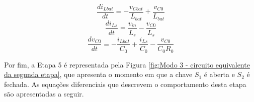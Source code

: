 

    

\begin{equation}
    \frac{d i_{Lbat}}{d t } =-\frac{v_{Cbat}}{L_{bat}}+\frac{v_{C0}}{L_{bat}}
    \label{ModoIIe3ilbat}
\end{equation}
\begin{equation}
    \frac{d i_{Ls}}{d t } =\frac{v_{in}}{L_{s}}-\frac{v_{C0}}{L_{s}}
    \label{ModoIIe3ils}
\end{equation}
\begin{equation}
    \frac{d v_{C0}}{d t } =-\frac{i_{Lbat}}{C_0}+ \frac{i_{Ls}}{C_0} -\frac {v_{C0}}{C_{0}R_{0}} 
    \label{ModoIIe3Vc0}
\end{equation}


Por fim, a Etapa 5 é representada pela Figura \ref{fig:Modo 3 - circuito equivalente da segunda etapa}, que apresenta o momento em que a chave $S_1$ é aberta e $S_2$ é fechada.  As equações diferenciais que descrevem o comportamento desta etapa são apresentadas a seguir.

